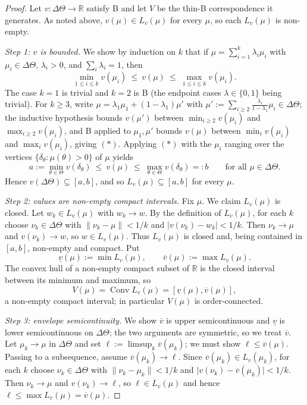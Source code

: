 \documentclass[11pt]{article}
\begin{document}
\begin{proof}
    Let $v:\Delta\Theta\to\mathbb{R}$ satisfy B and let $V$ be the thin-B
    correspondence it generates. As noted above, $v(\mu)\in L_v(\mu)$ for every
    $\mu$, so each $L_v(\mu)$ is non-empty.

    \emph{Step 1: $v$ is bounded.} We show by induction on $k$ that if
    $\mu=\sum_{i=1}^{k}\lambda_i\mu_i$ with $\mu_i\in\Delta\Theta$, $\lambda_i>0$,
    and $\sum_i\lambda_i=1$, then
    \[
        \min_{1\leq i\leq k}v(\mu_i)\ \leq\ v(\mu)\ \leq\ \max_{1\leq i\leq k}v(\mu_i).
        \tag{$\ast$}
    \]
    The case $k=1$ is trivial and $k=2$ is B (the endpoint cases
    $\lambda\in\{0,1\}$ being trivial). For $k\geq3$, write
    $\mu=\lambda_1\mu_1+(1-\lambda_1)\mu'$ with
    $\mu':=\sum_{i\geq2}\frac{\lambda_i}{1-\lambda_1}\mu_i\in\Delta\Theta$; the
    inductive hypothesis bounds $v(\mu')$ between $\min_{i\geq2}v(\mu_i)$ and
    $\max_{i\geq2}v(\mu_i)$, and B applied to $\mu_1,\mu'$ bounds $v(\mu)$ between
    $\min_i v(\mu_i)$ and $\max_i v(\mu_i)$, giving $(\ast)$. Applying $(\ast)$
    with the $\mu_i$ ranging over the vertices $\{\delta_\theta:\mu(\theta)>0\}$
    of $\mu$ yields
    \[
        a:=\min_{\theta\in\Theta}v(\delta_\theta)
        \ \leq\ v(\mu)\ \leq\
        \max_{\theta\in\Theta}v(\delta_\theta)=:b
        \qquad\text{for all }\mu\in\Delta\Theta.
    \]
    Hence $v(\Delta\Theta)\subseteq[a,b]$, and so $L_v(\mu)\subseteq[a,b]$ for
    every $\mu$.

    \emph{Step 2: values are non-empty compact intervals.} Fix $\mu$. We claim
    $L_v(\mu)$ is closed. Let $w_k\in L_v(\mu)$ with $w_k\to w$. By the
    definition of $L_v(\mu)$, for each $k$ choose $\nu_k\in\Delta\Theta$ with
    $\lVert\nu_k-\mu\rVert<1/k$ and $\lvert v(\nu_k)-w_k\rvert<1/k$. Then
    $\nu_k\to\mu$ and $v(\nu_k)\to w$, so $w\in L_v(\mu)$. Thus $L_v(\mu)$ is
    closed and, being contained in $[a,b]$, non-empty and compact. Put
    \[
        \underline v(\mu):=\min L_v(\mu),
        \qquad
        \overline v(\mu):=\max L_v(\mu).
    \]
    The convex hull of a non-empty compact subset of $\mathbb{R}$ is the closed
    interval between its minimum and maximum, so
    \[
        V(\mu)=\operatorname{Conv}L_v(\mu)=[\underline v(\mu),\overline v(\mu)],
        \tag{$\dagger$}
    \]
    a non-empty compact interval; in particular $V(\mu)$ is order-connected.

    \emph{Step 3: envelope semicontinuity.} We show $\overline v$ is upper
    semicontinuous and $\underline v$ is lower semicontinuous on $\Delta\Theta$;
    the two arguments are symmetric, so we treat $\overline v$. Let
    $\mu_k\to\mu$ in $\Delta\Theta$ and set $\ell:=\limsup_k\overline v(\mu_k)$;
    we must show $\ell\leq\overline v(\mu)$. Passing to a subsequence, assume
    $\overline v(\mu_k)\to\ell$. Since $\overline v(\mu_k)\in L_v(\mu_k)$, for each
    $k$ choose $\nu_k\in\Delta\Theta$ with $\lVert\nu_k-\mu_k\rVert<1/k$ and
    $\lvert v(\nu_k)-\overline v(\mu_k)\rvert<1/k$. Then $\nu_k\to\mu$ and
    $v(\nu_k)\to\ell$, so $\ell\in L_v(\mu)$ and hence
    $\ell\leq\max L_v(\mu)=\overline v(\mu)$.


\end{proof}
\end{document}
